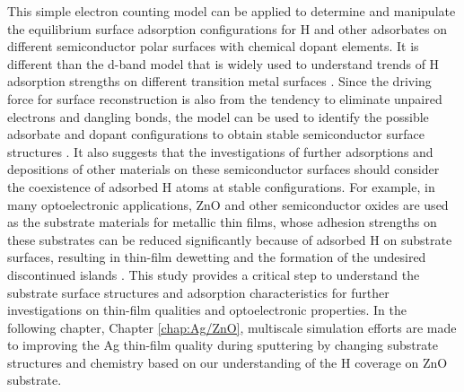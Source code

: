 This simple electron counting model can be applied to determine and manipulate the equilibrium surface adsorption configurations for H and other adsorbates on different semiconductor polar surfaces with chemical dopant elements. It is different than the d-band model that is widely used to understand trends of H adsorption strengths on different transition metal surfaces \cite{HAMMER95,Kibler05}. Since the driving force for surface reconstruction is also from the tendency to eliminate unpaired electrons and dangling bonds, the model can be used to identify the possible adsorbate and dopant configurations to obtain stable semiconductor surface structures \cite{Kaxiras87,pashley1989electron, Jacobs16ZnO}. It also suggests that the investigations of further adsorptions and depositions of other materials on these semiconductor surfaces should consider the coexistence of adsorbed H atoms at stable configurations. For example,  in many optoelectronic applications, ZnO and other semiconductor oxides are used as the substrate materials for metallic thin films, whose adhesion strengths on these substrates can be reduced significantly because of adsorbed H on substrate surfaces, resulting in thin-film dewetting and the formation of the undesired discontinued islands \cite{lin2007density,duriau2006growth}. This study provides a critical step to understand the substrate surface structures and adsorption characteristics for further investigations on thin-film qualities and optoelectronic properties. In the following chapter, Chapter \ref{chap:Ag/ZnO}, multiscale simulation efforts are made to improving the Ag thin-film quality during sputtering by changing substrate structures and chemistry based on our understanding of the H coverage on ZnO substrate.